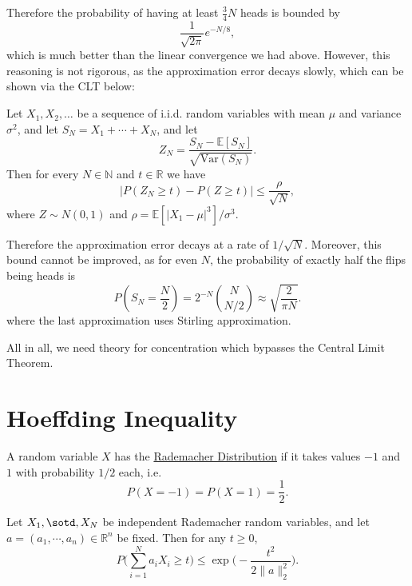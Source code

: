 \begin{example}
Therefore the probability of having at least $\frac{3}{4}N$ heads is bounded by 
\[ \frac{1}{\sqrt{2 \pi}}e^{-N / 8}, \]
which is much better than the linear convergence we had above. However, this reasoning is not rigorous, 
as the approximation error decays slowly, which can be shown via the CLT below: 

\begin{theorem}
Let $X_1, X_2, \dots$ be a sequence of i.i.d. random variables with mean $\mu$ and variance 
$\sigma^2$, and let $S_N = X_1 + \cdots + X_N$, and let 
\[ Z_N = \frac{S_N - \mathbb{E}[S_N]}{\sqrt{\mathrm{Var}(S_N)}}. \]
Then for every $N \in \mathbb{N}$ and $t \in \mathbb{R}$ we have 
\[ |P(Z_N \geq t) - P(Z \geq t)| \leq \frac{\rho}{\sqrt{N}}, \]
where $Z \sim N(0, 1)$ and $\rho = \mathbb{E}[|X_1 - \mu|^3] / \sigma^3$.
\end{theorem}
Therefore the approximation error decays at a rate of $1 / \sqrt{N}$. Moreover, this bound cannot be improved, 
as for even $N$, the probability of exactly half the flips being heads is 
\[ P(S_N = \frac{N}{2}) = 2^{-N} \binom{N}{N/2} \approx \sqrt{\frac{2}{\pi N}}. \]
where the last approximation uses Stirling approximation.

All in all, we need theory for concentration which bypasses the Central Limit Theorem.
\end{example}

\section*{Hoeffding Inequality}
\begin{definition}[]
A random variable $X$ has the \underline{Rademacher Distribution} if it takes values $-1$ and $1$ 
with probability $1/2$ each, i.e. 
\[ P(X = -1) = P(X = 1) = \frac{1}{2}. \]
\end{definition}

\begin{theorem}
Let $X_1, \sotd, X_N$ be independent Rademacher random variables, and let $a = (a_1, \cdots, a_n) 
\in \mathbb{R}^n$ be fixed. Then for any $t \geq 0$, 
\[ P \biggl( \sum_{i = 1}^{N} a_iX_i \geq t \biggr) \leq \exp{\biggl( -\frac{t^2}{2\|a\|_2^2} \biggr)}. \]
\end{theorem}

